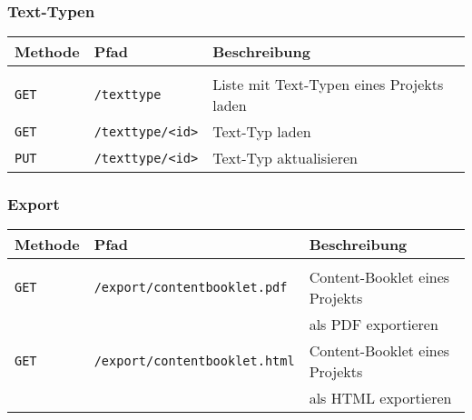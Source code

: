 \subsubsection{Text-Typen}

\begin{tabular}{@{}l l l}
\textbf{Methode} & \textbf{Pfad} & \textbf{Beschreibung}\\
\hline\\[-1.5ex]
\texttt{GET} & \texttt{/texttype} & Liste mit Text-Typen eines Projekts laden\\
\texttt{GET} & \texttt{/texttype/<id>} & Text-Typ laden\\
\texttt{PUT} & \texttt{/texttype/<id>} & Text-Typ aktualisieren\\
\end{tabular}

\subsubsection{Export}

\begin{tabular}{@{}l l l}
\textbf{Methode} & \textbf{Pfad} & \textbf{Beschreibung}\\
\hline\\[-1.5ex]
\texttt{GET} & \texttt{/export/contentbooklet.pdf} & Content-Booklet eines Projekts\\
&&als PDF exportieren\\
\texttt{GET} & \texttt{/export/contentbooklet.html} & Content-Booklet eines Projekts\\
&&als HTML exportieren\\
\end{tabular}
